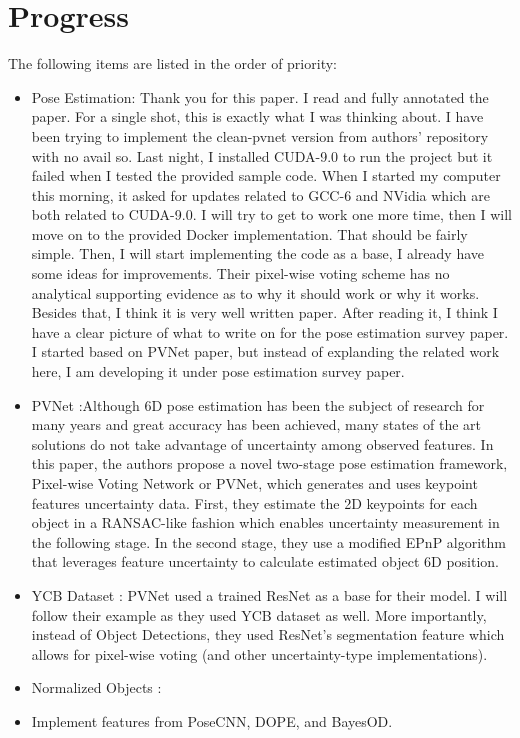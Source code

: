 \documentclass[11pt]{article}
\begin{document}
\section{Progress}
The following items are listed in the order of priority:
\begin{itemize}
      \item Pose Estimation: Thank you for this paper. I read and fully
      annotated the paper. For a single shot, this is exactly what I was thinking
      about. I have been trying to implement the clean-pvnet version from authors'
      repository with no avail so. Last night, I installed CUDA-9.0 to run the
      project but it failed when I tested the provided sample code. When I started
      my computer this morning, it asked for updates related to GCC-6 and NVidia
      which are both related to CUDA-9.0. I will try to get to work one more time,
      then I will move on to the provided Docker implementation. That should be
      fairly simple. Then, I will start implementing the code as a base, I already
      have some ideas for improvements. Their pixel-wise voting scheme has no
      analytical supporting evidence as to why it should work or why it works.
      Besides that, I think it is very well written paper. After reading it,
      I think I have a clear picture of what to write on for the pose estimation
      survey paper. I started based on PVNet paper, but instead of explanding the
      related work here, I am developing it under pose estimation survey paper.

      \item PVNet \cite{peng2019pvnet}:Although 6D pose estimation has been the
      subject of research for many
      years and great accuracy has been achieved, many states of the art solutions
      do not take advantage of uncertainty among observed features.
      In this paper, the authors propose a novel two-stage pose estimation
      framework, Pixel-wise Voting Network or PVNet, which generates and uses
      keypoint features uncertainty data. First, they estimate the 2D
      keypoints for each object in a RANSAC-like fashion which enables uncertainty
      measurement in the following stage. In the second stage, they use a
      modified EPnP algorithm \cite{lepetit2009epnp} that leverages feature
      uncertainty \cite{ferraz2014leveraging} to calculate estimated object 6D
      position.

      \item YCB Dataset \cite{calli2015ycb}: PVNet used a trained ResNet as a
      base for their model. I will follow their example as they used YCB dataset
      as well. More importantly, instead of Object Detections, they used ResNet's
      segmentation feature which allows for pixel-wise voting (and other
      uncertainty-type implementations).

      \item Normalized Objects \cite{Wang_2019_CVPR}:
      \item Implement features from PoseCNN, DOPE, and BayesOD.
\end{itemize}
\end{document}

